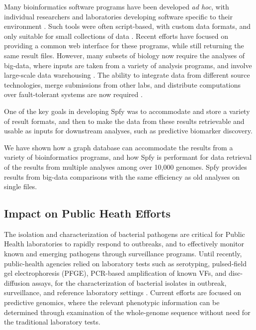 \documentclass{article}
\begin{document}
Many bioinformatics software programs have been developed \textit{ad hoc}, with individual researchers and laboratories developing software specific to their environment \cite{de2015trends}.
Such tools were often script-based, with custom data formats, and only suitable for small collections of data \cite{de2015trends}.
Recent efforts \cite{goecks2010galaxy,thomsen2016bacterial} have focused on providing a common web interface for these programs, while still returning the same result files.
However, many subsets of biology now require the analyses of big-data, where inputs are taken from a variety of analysis programs, and involve large-scale data warehousing \cite{schatz2015biological}.
The ability to integrate data from different source technologies, merge submissions from other labs, and distribute computations over fault-tolerant systems are now required \cite{schatz2015biological}.

One of the key goals in developing Spfy was to accommodate and store a variety of result formats, and then to make the data from these results retrievable and usable as inputs for downstream analyses, such as predictive biomarker discovery.

We have shown how a graph database can accommodate the results from a variety of bioinformatics programs, and how Spfy is performant for data retrieval of the results from multiple analyses among over 10,000 genomes. Spfy provides results from big-data comparisons with the same efficiency as old analyses on single files.

\subsection{Impact on Public Heath Efforts}

The isolation and characterization of bacterial pathogens are critical for Public Health laboratories to rapidly respond to outbreaks, and to effectively monitor known and emerging pathogens through surveillance programs.
Until recently, public-health agencies relied on laboratory tests such as serotyping, pulsed-field gel electrophoresis (PFGE), PCR-based amplification of known VFs, and disc-diffusion assays, for the characterization of bacterial isolates in outbreak, surveillance, and reference laboratory settings \cite{ronholm2016navigating}. Current efforts are focused on predictive genomics, where the relevant phenotypic information can be determined through examination of the whole-genome sequence without need for the traditional laboratory tests.
\end{document}
